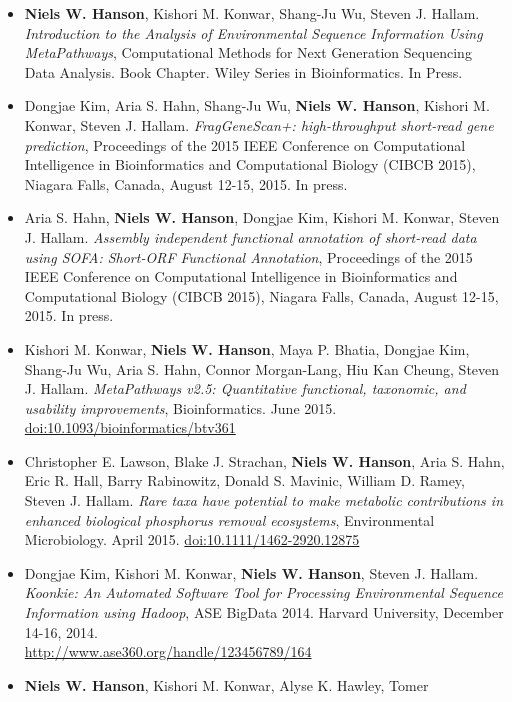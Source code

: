 \documentclass[print]{hanson_cv} %
\begin{document}
\begin{itemize}
\item
  \textbf{Niels W. Hanson}, Kishori M. Konwar, Shang-Ju Wu, Steven J. Hallam. \emph{Introduction to the Analysis of Environmental Sequence Information Using MetaPathways}, Computational Methods for Next Generation Sequencing Data Analysis. Book Chapter. Wiley Series in Bioinformatics. In Press.
\item
Dongjae Kim, Aria S. Hahn, Shang-Ju Wu, \textbf{Niels W. Hanson}, Kishori M. Konwar, Steven J. Hallam. \emph{FragGeneScan+: high-throughput short-read gene prediction}, Proceedings of the 2015 IEEE Conference on Computational Intelligence in Bioinformatics and Computational Biology (CIBCB 2015), Niagara Falls, Canada, August 12-15, 2015. In press.
\item
  Aria S. Hahn, \textbf{Niels W. Hanson}, Dongjae Kim, Kishori M. Konwar, Steven J. Hallam. \emph{Assembly independent functional annotation of short-read data using SOFA: Short-ORF Functional Annotation}, Proceedings of the 2015 IEEE Conference on Computational Intelligence in Bioinformatics and Computational Biology (CIBCB 2015), Niagara Falls, Canada, August 12-15, 2015. In press.
\item
Kishori M. Konwar, \textbf{Niels W. Hanson}, Maya P. Bhatia, Dongjae Kim, Shang-Ju Wu, Aria S. Hahn, Connor Morgan-Lang, Hiu Kan Cheung, Steven J. Hallam. \emph{MetaPathways v2.5: Quantitative functional, taxonomic, and usability improvements}, Bioinformatics. June 2015. \href{http://dx.doi.org/10.1093/bioinformatics/btv361}{doi:10.1093/bioinformatics/btv361}
\item
Christopher E. Lawson, Blake J. Strachan, \textbf{Niels W. Hanson}, Aria S. Hahn, Eric R. Hall, Barry Rabinowitz, Donald S. Mavinic, William D. Ramey, Steven J. Hallam. \emph{Rare taxa have potential to make metabolic contributions in enhanced biological phosphorus removal ecosystems}, Environmental Microbiology. April 2015. \href{http://dx.doi.org/10.1111/1462-2920.12875}{doi:10.1111/1462-2920.12875} 
\item
  Dongjae Kim, Kishori M. Konwar, \textbf{Niels W. Hanson}, Steven J.
  Hallam. \emph{Koonkie: An Automated Software Tool for Processing
  Environmental Sequence Information using Hadoop}, ASE BigData 2014.
  Harvard University, December 14-16,
  2014.\\\href{http://www.ase360.org/handle/123456789/164}{http://www.ase360.org/handle/123456789/164}
\item
  \textbf{Niels W. Hanson}, Kishori M. Konwar, Alyse K. Hawley, Tomer

\end{itemize}
\end{document}
